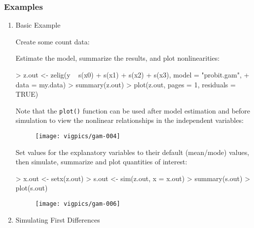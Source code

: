\subsubsection{Examples}
\begin{enumerate}
\item Basic Example

Create some count data:

\begin{Schunk}
\end{Schunk}

Estimate the model, summarize the results, and plot nonlinearities:

\begin{Schunk}
\begin{Sinput}
> z.out <- zelig(y ~ s(x0) + s(x1) + s(x2) + s(x3), model = "probit.gam", 
+     data = my.data)
> summary(z.out)
> plot(z.out, pages = 1, residuals = TRUE)
\end{Sinput}
\end{Schunk}
Note that the {\tt plot()} function can be used after model estimation and before simulation to view the nonlinear relationships in the independent variables: 

\begin{figure}[here]
\centering
\texttt{[image: vigpics/gam-004]}
\label{fig:plotgam}
\end{figure}

Set values for the explanatory variables to their default (mean/mode) values, then simulate, summarize and plot quantities of interest:
\begin{Schunk}
\begin{Sinput}
> x.out <- setx(z.out)
> s.out <- sim(z.out, x = x.out)
> summary(s.out)
> plot(s.out)
\end{Sinput}
\end{Schunk}

\begin{figure}[here]
\centering
\texttt{[image: vigpics/gam-006]}
\label{fig:plotgam}
\end{figure}

\item Simulating First Differences


\end{enumerate}
